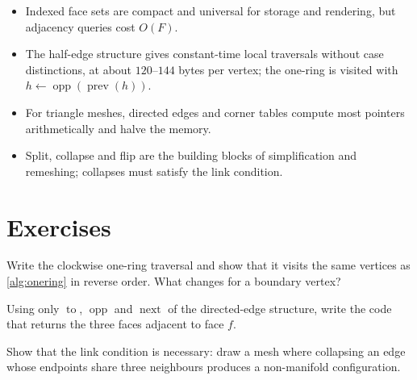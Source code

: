 \begin{keypoints}
\begin{itemize}[leftmargin=*]
  \item Indexed face sets are compact and universal for storage and rendering, but adjacency
  queries cost $O(F)$.
  \item The half-edge structure gives constant-time local traversals without case distinctions,
  at about $120$--$144$ bytes per vertex; the one-ring is visited with
  $h\leftarrow\operatorname{opp}(\operatorname{prev}(h))$.
  \item For triangle meshes, directed edges and corner tables compute most pointers
  arithmetically and halve the memory.
  \item Split, collapse and flip are the building blocks of simplification and remeshing; collapses
  must satisfy the link condition.
\end{itemize}
\end{keypoints}

\section*{Exercises}
\begin{exercise}
Write the clockwise one-ring traversal and show that it visits the same vertices as
\cref{alg:onering} in reverse order. What changes for a boundary vertex?
\end{exercise}
\begin{exercise}
Using only $\operatorname{to}$, $\operatorname{opp}$ and $\operatorname{next}$ of the directed-edge
structure, write the code that returns the three faces adjacent to face $f$.
\end{exercise}
\begin{exercise}
Show that the link condition is necessary: draw a mesh where collapsing an edge whose endpoints
share three neighbours produces a non-manifold configuration.
\end{exercise}
